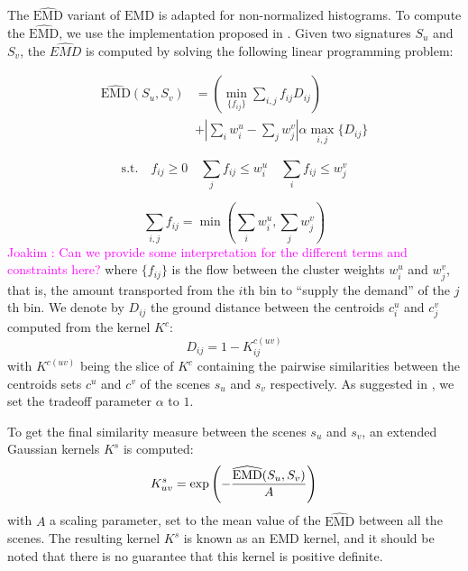 \documentclass[journal]{IEEEtran}
\newcommand*{\EMD}{\mathrm{EMD}}
\newcommand{\ja}[1]{\textcolor{magenta}{Joakim : #1}}
\begin{document}
The $\widehat{\EMD}$ variant of $\EMD$ is adapted for non-normalized histograms. To compute the $\widehat{\EMD}$, we use the implementation proposed in \cite{pele2009fast}. Given two signatures $S_u$ and $S_v$, the $\widehat{EMD}$ is computed by solving the following linear programming problem:

\begin{equation}
\begin{split}
\widehat{\EMD}(S_u,S_v) &=\left( \min\limits_{\lbrace f_{ij}\rbrace} \sum\limits_{i,j} f_{ij}D_{ij} \right) \\
&+ \left|\sum\limits_{i} w_i^u - \sum\limits_{j} w_j^v  \right| \alpha \max\limits_{i,j}\lbrace  D_{ij}\rbrace
\end{split}
\end{equation}

\begin{equation*}
\mathrm{s.t.} \quad f_{ij}\geq0 \quad \sum\limits_{j} f_{ij} \leq w_i^u \quad \sum\limits_{i} f_{ij} \leq w_j^v
\end{equation*}

\begin{equation*}
\sum\limits_{i,j}f_{ij} = \min\left( \sum\limits_{i} w_i^u ,\sum\limits_{j} w_j^v \right)
\end{equation*} \ja{Can we provide some interpretation for the different terms and constraints here?}
where $\lbrace f_{ij} \rbrace$ is the flow between the cluster weights $w_i^u$ and $w_j^v$, that is, the amount transported from the $i$th bin to ``supply the demand'' of the $j$th bin. We denote by $D_{ij}$ the ground distance between the centroids $c_i^u$ and $c_j^v$ computed from the kernel $K^c$:
\begin{equation*}
D_{ij}=1-K^{c(uv)}_{ij}
\end{equation*}
with $K^{c(uv)}$ being the slice of $K^{c}$ containing the pairwise similarities between the centroids sets $c^u$ and $c^v$ of the scenes $s_u$ and $s_v$ respectively. As suggested in \cite{pele2009fast}, we set the tradeoff parameter $\alpha$ to $1$.

To get the final similarity measure between the scenes $s_u$ and $s_v$, an extended Gaussian kernels $K^s$ \cite{chapelle1999support,jing2003support} is computed:
\begin{equation}
\label{eq:ks}
K_{uv}^s = \exp\left( - \dfrac{\widehat{\EMD}(S_u,S_v)}{A} \right) \\
\end{equation}
with $A$ a scaling parameter, set to the mean value of the $\widehat{\EMD}$ between all the scenes. The resulting kernel $K^s$ is known as an EMD kernel, and it should be noted that there is no guarantee that this kernel is positive definite.
\end{document}
